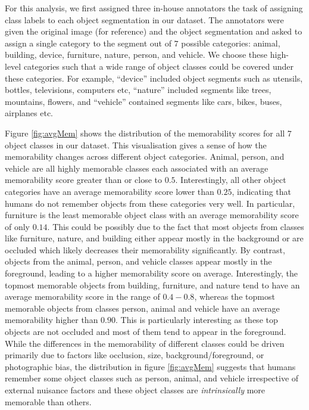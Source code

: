 For this analysis, we first assigned three in-house annotators the task of assigning class labels to each object segmentation in our dataset. The annotators were given the original image (for reference) and the object segmentation and asked to assign a single category to the segment out of $7$ possible categories: animal, building, device, furniture, nature, person, and vehicle. We choose these high-level categories such that a wide range of object classes could be covered under these categories. For example, “device” included object segments such as  utensils, bottles, televisions, computers etc, “nature” included segments like trees, mountains, flowers, and “vehicle” contained segments like cars, bikes, buses, airplanes etc.

Figure \ref{fig:avgMem} shows the distribution of the memorability scores for all $7$ object classes in our dataset. This visualisation gives a sense of how the memorability changes across different object categories. Animal, person, and vehicle are all highly memorable classes each associated with  an average memorability score greater than or close to $0.5$. Interestingly, all other object categories have an average memorability score lower than $0.25$, indicating that humans do not remember objects from these categories very well. In particular, furniture is the least memorable object class with an average memorability score of only $0.14$. This could be possibly due to the fact that most objects from classes like furniture, nature, and building either appear mostly in the background or are occluded which likely decreases their memorability significantly. By contrast, objects from the animal, person, and vehicle classes appear mostly in the foreground, leading to a higher memorability score on average. Interestingly, the topmost memorable objects from building, furniture, and nature tend to have an average memorability score in the range of $0.4 - 0.8$, whereas the topmost memorable objects from classes person, animal and vehicle have an average memorability higher than $0.90$. This is particularly interesting as these top objects are not occluded and most of them tend to appear in the foreground. While the differences in the memorability of different classes could be driven primarily due to factors like occlusion, size, background/foreground, or photographic bias, the distribution in figure \ref{fig:avgMem} suggests that humans remember some object classes such as person, animal, and vehicle irrespective of external nuisance factors and these object classes are \textit{intrinsically} more memorable than others.

